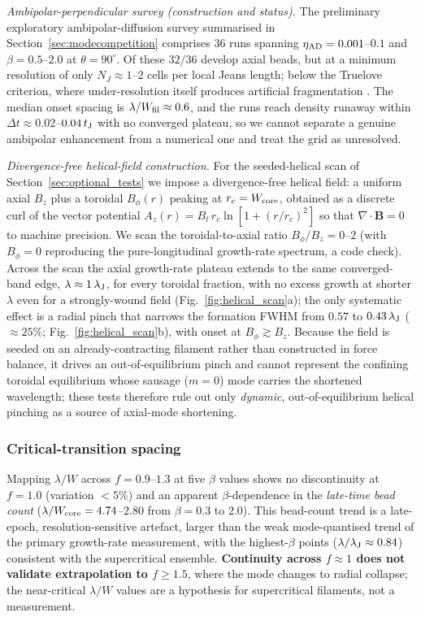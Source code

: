 \documentclass[usenatbib,twoside,twocolumn]{mnras}
\begin{document}
\smallskip\noindent\emph{Ambipolar-perpendicular survey (construction and status).} The preliminary exploratory ambipolar-diffusion survey summarised in Section~\ref{sec:modecompetition} comprises 36 runs spanning $\eta_{\rm AD}=0.001$--$0.1$ and $\beta=0.5$--$2.0$ at $\theta=90^\circ$. Of these $32/36$ develop axial beads, but at a minimum resolution of only $N_J\approx1$--$2$ cells per local Jeans length; below the Truelove criterion, where under-resolution itself produces artificial fragmentation \citep{Truelove1997}. The median onset spacing is $\lambda/W_{\rm fil}\approx0.6$, and the runs reach density runaway within $\Delta t\approx0.02$--$0.04\,t_{\rm J}$ with no converged plateau, so we cannot separate a genuine ambipolar enhancement from a numerical one and treat the grid as unresolved.

\smallskip\noindent\emph{Divergence-free helical-field construction.} For the seeded-helical scan of Section~\ref{sec:optional_tests} we impose a divergence-free helical field: a uniform axial $B_z$ plus a toroidal $B_\phi(r)$ peaking at $r_c=W_{\rm core}$, obtained as a discrete curl of the vector potential $A_z(r)=B_t\,r_c\ln[1+(r/r_c)^2]$ so that $\nabla\!\cdot\!\mathbf{B}=0$ to machine precision. We scan the toroidal-to-axial ratio $B_\phi/B_z=0$--$2$ (with $B_\phi=0$ reproducing the pure-longitudinal growth-rate spectrum, a code check). Across the scan the axial growth-rate plateau extends to the same converged-band edge, $\lambda\approx1\,\lambda_{\rm J}$, for every toroidal fraction, with no excess growth at shorter $\lambda$ even for a strongly-wound field (Fig.~\ref{fig:helical_scan}a); the only systematic effect is a radial pinch that narrows the formation FWHM from $0.57$ to $0.43\,\lambda_{\rm J}$ ($\approx25\%$; Fig.~\ref{fig:helical_scan}b), with onset at $B_\phi\gtrsim B_z$. Because the field is seeded on an already-contracting filament rather than constructed in force balance, it drives an out-of-equilibrium pinch and cannot represent the confining toroidal equilibrium whose sausage ($m=0$) mode carries the shortened \citet{Fiege2000} wavelength; these tests therefore rule out only \emph{dynamic}, out-of-equilibrium helical pinching as a source of axial-mode shortening.

\subsubsection{Critical-transition spacing}

Mapping $\lambda/W$ across $f=0.9$--$1.3$ at five $\beta$ values shows no discontinuity at $f=1.0$ (variation $<5\%$) and an apparent $\beta$-dependence in the \emph{late-time bead count} ($\lambda/W_{\rm core}=4.74$--$2.80$ from $\beta=0.3$ to $2.0$). This bead-count trend is a late-epoch, resolution-sensitive artefact, larger than the weak mode-quantised trend of the primary growth-rate measurement, with the highest-$\beta$ points ($\lambda/\lambda_{\rm J}\approx0.84$) consistent with the supercritical ensemble. \textbf{Continuity across $f\approx1$ does not validate extrapolation to $f\geq1.5$}, where the mode changes to radial collapse; the near-critical $\lambda/W$ values are a hypothesis for supercritical filaments, not a measurement.
\end{document}
